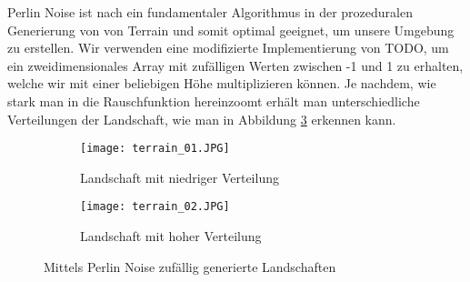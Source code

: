 

Perlin Noise ist nach \cite{parberry2015modeling} ein fundamentaler Algorithmus in der prozeduralen Generierung von von Terrain und somit optimal geeignet, um unsere Umgebung zu erstellen. Wir verwenden eine modifizierte Implementierung von TODO, um ein zweidimensionales Array mit zufälligen Werten zwischen -1 und 1 zu erhalten, welche wir mit einer beliebigen Höhe multiplizieren können. Je nachdem, wie stark man in die Rauschfunktion \glqq hereinzoomt \grqq{} erhält man unterschiedliche Verteilungen der Landschaft, wie man in Abbildung \ref{img:randomTerrain} erkennen kann.

\begin{figure}[h]
    \centering
    \begin{subfigure}[b]{0.49\textwidth}
        \texttt{[image: terrain\_01.JPG]}
        \caption{Landschaft mit niedriger Verteilung}
        \label{img:randomTerrainA}
    \end{subfigure}
    \begin{subfigure}[b]{0.49\textwidth}
        \texttt{[image: terrain\_02.JPG]}
        \caption{Landschaft mit hoher Verteilung}
        \label{img:randomTerrainB}
    \end{subfigure}
    \caption{Mittels Perlin Noise zufällig generierte Landschaften}
    \label{img:randomTerrain}
\end{figure}

